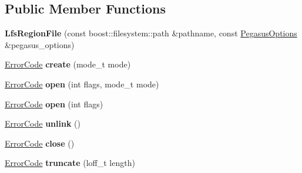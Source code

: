 \subsection*{Public Member Functions}
\begin{DoxyCompactItemize}
\item 
{\bfseries Lfs\+Region\+File} (const boost\+::filesystem\+::path \&pathname, const \hyperlink{structalps_1_1PegasusOptions}{Pegasus\+Options} \&pegasus\+\_\+options)\hypertarget{classalps_1_1LfsRegionFile_a81c1bef03c892fe27b3c436d541aa164}{}\label{classalps_1_1LfsRegionFile_a81c1bef03c892fe27b3c436d541aa164}

\item 
\hyperlink{group__ERRORCODES_ga6263a3c9a0b8d36aea21cdd835ac99fe}{Error\+Code} {\bfseries create} (mode\+\_\+t mode)\hypertarget{classalps_1_1LfsRegionFile_aec4c0a975a453de5a92313a15febd797}{}\label{classalps_1_1LfsRegionFile_aec4c0a975a453de5a92313a15febd797}

\item 
\hyperlink{group__ERRORCODES_ga6263a3c9a0b8d36aea21cdd835ac99fe}{Error\+Code} {\bfseries open} (int flags, mode\+\_\+t mode)\hypertarget{classalps_1_1LfsRegionFile_a40ed4ec47a3f8f294026c2599e0878f7}{}\label{classalps_1_1LfsRegionFile_a40ed4ec47a3f8f294026c2599e0878f7}

\item 
\hyperlink{group__ERRORCODES_ga6263a3c9a0b8d36aea21cdd835ac99fe}{Error\+Code} {\bfseries open} (int flags)\hypertarget{classalps_1_1LfsRegionFile_a97048d3ee58fc7e2fb107dd7fa75c97d}{}\label{classalps_1_1LfsRegionFile_a97048d3ee58fc7e2fb107dd7fa75c97d}

\item 
\hyperlink{group__ERRORCODES_ga6263a3c9a0b8d36aea21cdd835ac99fe}{Error\+Code} {\bfseries unlink} ()\hypertarget{classalps_1_1LfsRegionFile_ac31fc14d0caf4b6448478032b859907c}{}\label{classalps_1_1LfsRegionFile_ac31fc14d0caf4b6448478032b859907c}

\item 
\hyperlink{group__ERRORCODES_ga6263a3c9a0b8d36aea21cdd835ac99fe}{Error\+Code} {\bfseries close} ()\hypertarget{classalps_1_1LfsRegionFile_aafbc14718eaf10a372a7f7e1ce980cc0}{}\label{classalps_1_1LfsRegionFile_aafbc14718eaf10a372a7f7e1ce980cc0}

\item 
\hyperlink{group__ERRORCODES_ga6263a3c9a0b8d36aea21cdd835ac99fe}{Error\+Code} {\bfseries truncate} (loff\+\_\+t length)\hypertarget{classalps_1_1LfsRegionFile_ae6b7e891a39e1fe2b35a3301a94e89f0}{}\label{classalps_1_1LfsRegionFile_ae6b7e891a39e1fe2b35a3301a94e89f0}


\end{DoxyCompactItemize}
